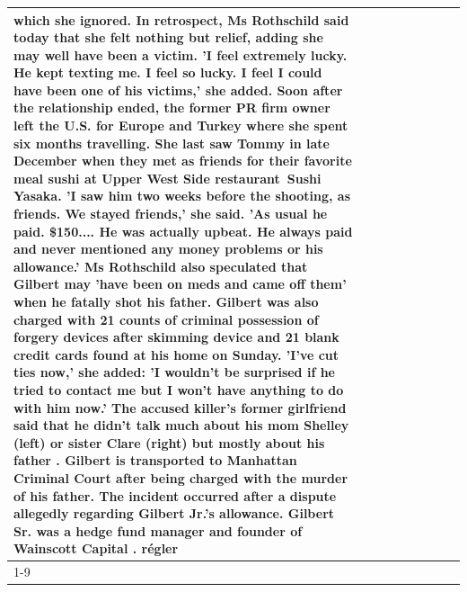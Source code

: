 \begin{table}[H]
\begin{tabular}{lllrlllll}
which she ignored. In retrospect, Ms Rothschild said today that she felt nothing but relief, adding she may well have been a victim. 'I feel extremely lucky. He kept texting me. I feel so lucky. I feel I could have been one of his victims,' she added. Soon after the relationship ended, the former PR firm owner left the U.S. for Europe and Turkey where she spent six months  travelling. She last saw Tommy in late December when they met as friends for their favorite meal sushi at Upper West Side restaurant Sushi Yasaka. 'I saw him two weeks before the shooting, as friends. We stayed friends,' she said. 'As usual he paid. \$150.... He was actually upbeat. He always paid and never mentioned any money problems or his allowance.' Ms Rothschild also speculated that Gilbert may 'have been on meds and came off them' when he fatally shot his father. Gilbert was also charged with 21 counts of criminal possession of forgery devices after skimming device and 21 blank credit cards found at his home on Sunday. 'I've cut ties now,' she added: 'I wouldn’t be surprised if he tried to contact me but I won’t have anything to do with him now.' The accused killer's former girlfriend said that he didn't talk much about his mom Shelley (left) or sister Clare (right) but mostly about his father . Gilbert is transported to Manhattan Criminal Court  after being charged with the murder of his father. The incident occurred after a dispute allegedly regarding Gilbert Jr.'s allowance. Gilbert Sr. was a hedge fund manager and founder of Wainscott Capital . régler \\
\cline{1-9}

\end{tabular}
\end{table}
